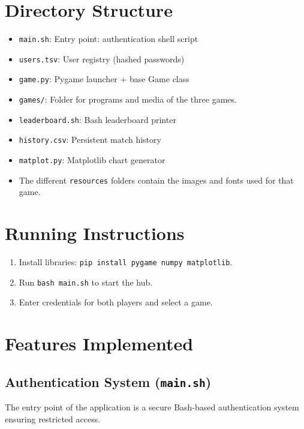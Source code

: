 \documentclass[12pt]{article}
\begin{document}
\section{Directory Structure}



\begin{itemize}
        \item \texttt{main.sh}: Entry point: authentication shell script
        \item \texttt{users.tsv}: User registry (hashed passwords)

        \item \texttt{game.py}: Pygame launcher + base Game class
        \item \texttt{games/}: Folder for programs and media of the three games.
        \item \texttt{leaderboard.sh}: Bash leaderboard printer
        \item \texttt{history.csv}: Persistent match history
        \item \texttt{matplot.py}: Matplotlib chart generator
        \item The different \texttt{resources} folders contain the images and fonts used for that game.
    \end{itemize}
\section{Running Instructions}
\begin{enumerate}
    \item Install libraries: \texttt{pip install pygame numpy matplotlib}.
    \item Run \texttt{bash main.sh} to start the hub.
    \item Enter credentials for both players and select a game.
\end{enumerate}

\section{Features Implemented}

\subsection{Authentication System (\texttt{main.sh})}
The entry point of the application is a secure Bash-based authentication system ensuring restricted access.
\end{document}
